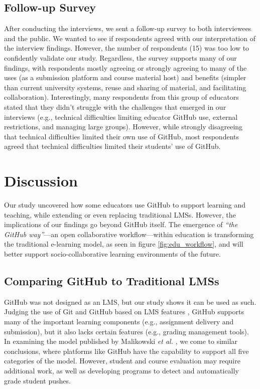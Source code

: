 \subsection{Follow-up Survey}
After conducting the interviews, we sent a follow-up survey to both interviewees and the public. We wanted to see if respondents agreed with our interpretation of the interview findings. However, the number of respondents (15) was too low to confidently validate our study. Regardless, the survey supports many of our findings, with respondents mostly agreeing or strongly agreeing to many of the uses (as a submission platform and course material host) and benefits (simpler than current university systems, reuse and sharing of material, and facilitating collaboration). Interestingly, many respondents from this group of educators stated that they didn't struggle with the challenges that emerged in our interviews (e.g., technical difficulties limiting educator GitHub use, external restrictions, and managing large groups). However, while strongly disagreeing that technical difficulties limited their own use of GitHub, most respondents agreed that technical difficulties limited their students' use of GitHub.

\section{Discussion}
Our study uncovered how some educators use GitHub to support learning and teaching, while extending or even replacing traditional LMSs. However, the implications of our findings go beyond GitHub itself. The emergence of \textit{``the GitHub way''}---an open collaborative workflow---within education is transforming the traditional e-learning model, as seen in figure \ref{fig:edu_workflow}, and will better support socio-collaborative learning environments \cite{kreijns2002sociability} of the future.

\subsection{Comparing GitHub to Traditional LMSs}
GitHub was not designed as an LMS, but our study shows it can be used as such. Judging the use of Git and GitHub based on LMS features \cite{kumar2011comparative}, GitHub supports many of the important learning components (e.g., assignment delivery and submission), but it also lacks certain features (e.g., grading management tools). In examining the model published by Malikowski \textit{et al.} \cite{malikowski2007model}, we come to similar conclusions, where platforms like GitHub have the capability to support all five categories of the model. However, student and course evaluation may require additional work, as well as developing programs to detect and automatically grade student pushes.

